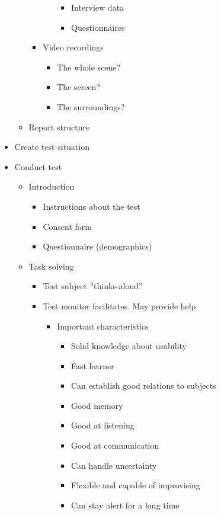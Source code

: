 \begin{itemize}
\begin{itemize}
\begin{itemize}
\begin{itemize}
				\begin{itemize}
					\item Interview data
					\item Questionnaires
				\end{itemize}
			\end{itemize}
			\item Video recordings
			\begin{itemize}
				\item The whole scene?
				\item The screen?
				\item The surroundings?
			\end{itemize}
		\end{itemize}
		\item Report structure
	\end{itemize}
	\item Create test situation
	\item Conduct test
	\begin{itemize}
		\item Introduction
		\begin{itemize}
			\item Instructions about the test
			\item Consent form
			\item Questionnaire (demographics)
		\end{itemize}
		\item Task solving
		\begin{itemize}
			\item Test subject ''thinks-aloud''
			\item Test monitor facilitates. May provide help
			\begin{itemize}
				\item Important characteristics
				\begin{itemize}
					\item Solid knowledge about usability
					\item Fast learner
					\item Can establish good relations to subjects
					\item Good memory
					\item Good at listening
					\item Good at communication
					\item Can handle uncertainty
					\item Flexible and capable of improvising
					\item Can stay alert for a long time

\end{itemize}
\end{itemize}
\end{itemize}
\end{itemize}
\end{itemize}
